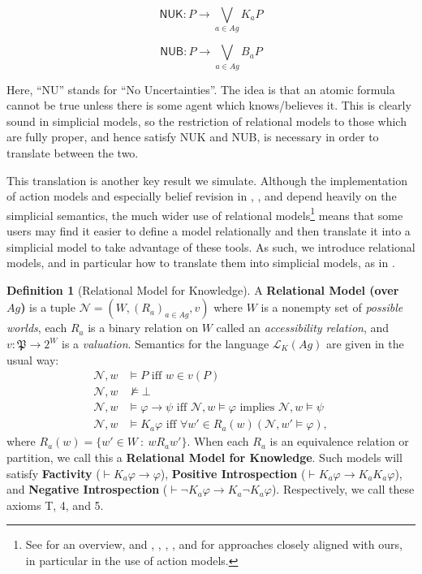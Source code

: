 \documentclass[11pt]{article}
\theoremstyle{definition}
\newtheorem{definition}{Definition}[section]
\newcommand{\defin}[1]{\textbf{#1}}
\renewcommand{\phi}{\varphi}
\newcommand{\lthen}{\rightarrow}
\renewcommand{\L}{\mathcal{L}}
\newcommand{\N}{\mathcal{N}}
\begin{document}
	$$\textsf{NUK}:P\rightarrow\bigvee_{a\in Ag}K_aP$$
	
	$$\textsf{NUB}:P\rightarrow\bigvee_{a\in Ag}B_aP$$
	
	Here, ``NU'' stands for ``No Uncertainties''. The idea is that an atomic formula cannot be true unless there is some agent which knows/believes it. This is clearly sound in simplicial models, so the restriction of relational models to those which are fully proper, and hence satisfy \textsf{NUK} and \textsf{NUB}, is necessary in order to translate between the two.
	
	This translation is another key result we simulate. Although the implementation of action models and especially belief revision in \cite{SimpBelRev}, \cite{SimpAct}, and \cite{TechMemo} depend heavily on the simplicial semantics, the much wider use of relational models\footnote{See \cite{DC5} for an overview, and \cite{KaSC}, \cite{KaG}, \cite{ActionDC}, \cite{CPM}, and \cite{CPaAM} for approaches closely aligned with ours, in particular in the use of action models.} means that some users may find it easier to define a model relationally and then translate it into a simplicial model to take advantage of these tools. As such, we introduce relational models, and in particular how to translate them into simplicial models, as in \cite{BelSimp}.
	
	\begin{definition}[Relational Model for Knowledge] A \defin{Relational Model (over $Ag$)} is a tuple $\N = (W,(R_{a})_{a \in Ag},v)$ where $W$ is a nonempty set of \emph{possible worlds}, each $R_{a}$ is a binary relation on $W$ called an \emph{accessibility relation}, and $v: \mathfrak{P} \to 2^{W}$ is a \emph{valuation}. Semantics for the language $\L_{K}(Ag)$ are given in the usual way:
	\begin{align*}
		\N,w & \models P \text{ iff } w \in v(P)\\
		\N,w & \nvDash \bot\\
		\N,w & \models \phi \lthen \psi \text{ iff } \N,w \models \phi \text{ implies } \N,w \models \psi\\
		\N,w & \models K_a \phi \text{ iff } \forall w' \in R_{a}(w) (\N,w' \models \phi),
	\end{align*}
	where $R_{a}(w) = \{w' \in W \: : \: wR_{a}w'\}$. When each $R_{a}$ is an equivalence relation or partition, we call this a \defin{Relational Model for Knowledge}. Such models will satisfy \defin{Factivity} ($\vdash K_a\varphi\rightarrow\varphi$), \defin{Positive Introspection} ($\vdash K_a\varphi\rightarrow K_aK_a\varphi$), and \defin{Negative Introspection} ($\vdash \neg K_a\varphi\rightarrow K_a\neg K_a\varphi$). Respectively, we call these axioms \textsf{T}, \textsf{4}, and \textsf{5}.
	\end{definition}
\end{document}
